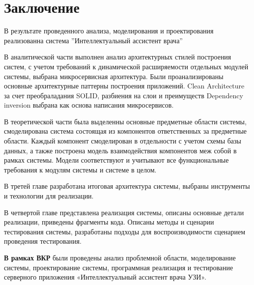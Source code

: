 \chapter*{Заключение}

В результате проведенного анализа, моделирования и проектирования реализованна система ”Интеллектуальный ассистент врача”


В аналитической части выполнен анализ архитектурных стилей построения систем, с учетом требований к динамической расширяемости отдельных модулей системы, выбрана микросервисная архитектура.
Были проанализированы основные архитектурные паттерны построения приложений. Clean Architecture за счет преобраладания SOLID, разбиения на слои и преимуществ Dependency inversion выбрана как основа написания микросервисов.


В теоретической части была выделенны основные предметные области системы, смоделирована система состоящая из компонентов ответственных за предметные области.
Каждый компонент смоделирован в отдельности с учетом схемы базы данных, а также построена модель взаимодействия компонентов меж собой в рамках системы. 
Модели соответствуют и учитывают все функциональные требования к модулям системы и системе в целом.


В третей главе разработана итоговая архитектура системы, выбраны инструменты и технологии для реализации.


В четвертой главе представлена реализация системы, описаны основные детали реализации, приведены фрагменты кода. Описаны методы и сценарии тестирования системы, разработаны
подходы для воспроизводимости сценарием проведения тестирования.


\textbf{В рамках ВКР} были проведены анализ проблемной области, моделирование системы, проектирование системы, программная реализация и тестирование серверного 
приложения «Интеллектуальный ассистент врача УЗИ».

